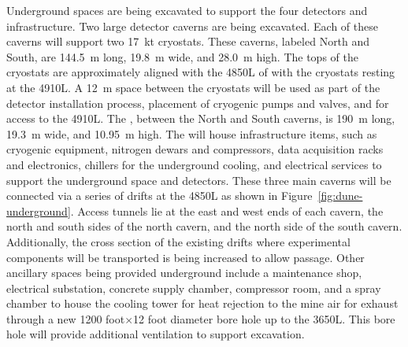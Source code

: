 Underground spaces are being excavated to support the four
 detectors and infrastructure.  Two large detector caverns
are being excavated.  Each of these caverns will support two
\SI{17}{\kilo\tonne} cryostats.  These caverns, labeled North and
South, are \SI{144.5}{\meter} long, \SI{19.8}{\meter} wide,  and 
\SI{28.0}{\meter} high. The tops of the cryostats are approximately
aligned with the 4850L of  with the cryostats resting
at the 4910L.  A \SI{12}{\meter} space between the cryostats will
be used as part of the detector installation process, placement of
cryogenic pumps and valves, and for access to the 4910L.  The
, between the North and South caverns, is \SI{190}{\meter}
long, \SI{19.3}{\meter} wide, and \SI{10.95}{\meter} high.  The
 will house infrastructure items, such as cryogenic
equipment, nitrogen dewars and compressors, data acquisition racks and
electronics, chillers for the underground cooling, and electrical
services to support the underground space and detectors.  These three
main caverns will be connected via a series of drifts at the 4850L as shown in
Figure~\ref{fig:dune-underground}. Access tunnels lie at the east and
west ends of each cavern, the north and south sides of the north cavern, and
the north side of the south cavern. Additionally, the cross section of the
existing drifts where experimental components will be transported is
being increased to allow passage.  Other ancillary spaces being
provided underground include a maintenance shop, electrical
substation, concrete supply chamber, compressor room, and  a spray chamber
to house the cooling tower for heat rejection to the mine air for
exhaust through a new 1200 foot$\times$12 foot diameter bore hole up
to the 3650L.  This bore hole will provide additional ventilation
to support excavation.


